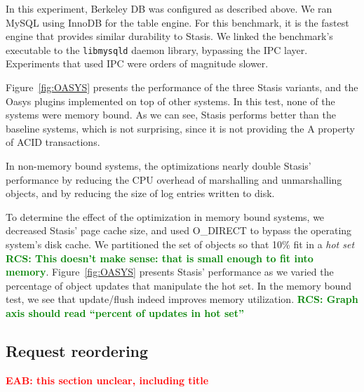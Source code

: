 \documentclass[letterpaper,twocolumn,10pt]{article}
\newcommand{\yad}{Stasis\xspace}
\newcommand{\yads}{Stasis'\xspace}
\newcommand{\oasys}{Oasys\xspace}
\newcommand{\eab}[1]{\textcolor{red}{\bf EAB: #1}}
\newcommand{\rcs}[1]{\textcolor{green}{\bf RCS: #1}}
\begin{document}
In this experiment, Berkeley DB was configured as described above.  We
ran MySQL using InnoDB for the table engine.  For this benchmark, it
is the fastest engine that provides similar durability to \yad. We
linked the benchmark's executable to the {\tt libmysqld} daemon library,
bypassing the IPC layer. Experiments that used IPC were orders of magnitude slower.

Figure~\ref{fig:OASYS} presents the performance of the three \yad
variants, and the \oasys plugins implemented on top of other
systems.  In this test, none of the systems were memory bound.  As
we can see, \yad performs better than the baseline systems, which is
not surprising, since it is not providing the A property of ACID
transactions.

In non-memory bound systems, the optimizations nearly double \yads
performance by reducing the CPU overhead of marshalling and
unmarshalling objects, and by reducing the size of log entries written
to disk.

To determine the effect of the optimization in memory bound systems,
we decreased \yads page cache size, and used O\_DIRECT to bypass the
operating system's disk cache.  We partitioned the set of objects
so that 10\% fit in a {\em hot set} \rcs{This doesn't make sense: that is small enough to fit into
memory}.  Figure~\ref{fig:OASYS} presents \yads performance as we varied the
percentage of object updates that manipulate the hot set.  In the
memory bound test, we see that update/flush indeed improves memory
utilization. \rcs{Graph axis should read ``percent of updates in hot set''}

\subsection{Request reordering}

\eab{this section unclear, including title}
\end{document}
